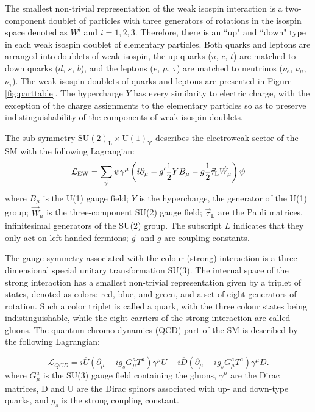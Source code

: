 The smallest non-trivial representation of the weak isospin interaction is
a two-component doublet of particles with three generators
of rotations in the isospin space denoted as $W^i$ and $i=1,2,3$.
Therefore, there is an ``up" and ``down" type in each weak isospin doublet of elementary particles.
Both quarks and leptons are arranged into doublets of weak isospin, the up quarks ($u$, $c$, $t$)
are matched to down quarks ($d$, $s$, $b$), and the leptons ($e$, $\mu$, $\tau$) are matched
to neutrinos ($\nu_e$, $\nu_{\mu}$, $\nu_{\tau}$). The weak isospin doublets of quarks and leptons
are presented in Figure \ref{fig:parttable}.  
The hypercharge $Y$ has every similarity to electric charge, with the exception of the
charge assignments to the elementary particles so as to preserve indistinguishability of the components
of weak isospin doublets.

The sub-symmetry $\text{SU}(2)_\text{L} \times \text{U}(1)_\text{Y}$ describes the electroweak sector of the SM with the 
following Lagrangian:
\begin{equation}
\mathcal{L}_\mathrm{EW} = \sum_\psi\bar\psi\gamma^\mu \left(i\partial_\mu-g^\prime{1\over2}YB_\mu-g{1\over2}\vec\tau_\mathrm{L}\vec W_\mu\right)\psi
\label{eqn:LagrEWK}
\end{equation}
where $B_{\mu}$ is the U(1) gauge field; $Y$ is the hypercharge, the generator of 
the U(1) group; $\vec{W}_\mu$ is the three-component SU(2) gauge field; $\vec{\tau}_\mathrm{L}$
 are the Pauli matrices, infinitesimal generators of the SU(2) group. 
The subscript $L$ indicates that they only act on left-handed fermions; $g^{'}$ and $g$
 are coupling constants.


The gauge symmetry associated with the colour (strong) interaction is a three-dimensional special
unitary transformation SU(3). The internal space of the strong interaction has a smallest
non-trivial representation given by a triplet of states, denoted as colors: red, blue, and green,
and a set of eight generators of rotation. Such a color triplet is called a quark, with the
three colour states being indistinguishable, while the
eight carriers of the strong interaction are called gluons. 
The quantum chromo-dynamics (QCD)
part of the SM is described by the following Lagrangian:

\begin{equation}
\mathcal{L}_{QCD} = i\overline U (\partial_\mu-ig_sG_\mu^a T^a)\gamma^\mu U + i\overline D (\partial_\mu-i g_s G_\mu^a T^a)\gamma^\mu D.
\label{eqn:LagrQCD}
\end{equation}
where $G_\mu^a$ is the SU(3) gauge field containing the gluons, $\gamma^\mu$ are the Dirac matrices,
 D and U are the Dirac spinors associated with up- and down-type quarks, and $g_s$ 
is the strong coupling constant.

